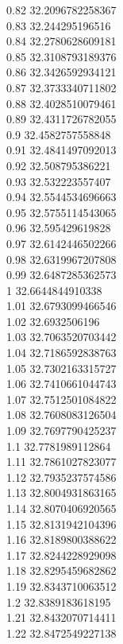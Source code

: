 {0.82	32.2096782258367\\
0.83	32.244295196516\\
0.84	32.2780628609181\\
0.85	32.3108793189376\\
0.86	32.3426592934121\\
0.87	32.3733340711802\\
0.88	32.4028510079461\\
0.89	32.4311726782055\\
0.9	32.4582757558848\\
0.91	32.4841497092013\\
0.92	32.508795386221\\
0.93	32.532223557407\\
0.94	32.5544534696663\\
0.95	32.5755114543065\\
0.96	32.595429619828\\
0.97	32.6142446502266\\
0.98	32.6319967207808\\
0.99	32.6487285362573\\
1	32.6644844910338\\
1.01	32.6793099466546\\
1.02	32.6932506196\\
1.03	32.7063520703442\\
1.04	32.7186592838763\\
1.05	32.7302163315727\\
1.06	32.7410661044743\\
1.07	32.7512501084822\\
1.08	32.7608083126504\\
1.09	32.7697790425237\\
1.1	32.7781989112864\\
1.11	32.7861027823077\\
1.12	32.7935237574586\\
1.13	32.8004931863165\\
1.14	32.8070406920565\\
1.15	32.8131942104396\\
1.16	32.8189800388622\\
1.17	32.8244228929098\\
1.18	32.8295459682862\\
1.19	32.8343710063512\\
1.2	32.8389183618195\\
1.21	32.8432070714411\\
1.22	32.8472549227138\\
}
